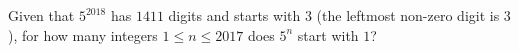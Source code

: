 Given that $5^{2018}$ has $1411$ digits and starts with $3$ (the leftmost non-zero digit is $3$), for how many integers $1\leq n\leq2017$ does $5^n$ start with $1$?